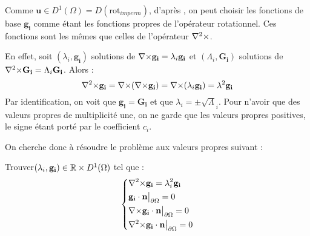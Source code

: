 Comme $\mathbf{u}\in D^1(\Omega)=D(\mathrm{rot}_{imperm})$, d'après \cite{Penel2004}, on peut choisir les fonctions de base
$\mathbf{g_i}$ comme étant les fonctions propres de l'opérateur rotationnel. Ces
fonctions sont les mêmes que celles de l'opérateur ${\nabla^2\times}$.

En effet, soit $(\lambda_i,\mathbf{g_i})$ solutions de ${\nabla\times} \mathbf{g_i} = \lambda_i\mathbf{g_i}$ et $(\Lambda_i,\mathbf{G_i})$ solutions de ${\nabla^2\times} \mathbf{G_i} = \Lambda_i\mathbf{G_i}$. Alors :
\[ {\nabla^2\times} \mathbf{g_i} = {\nabla\times}({\nabla\times} \mathbf{g_i})={\nabla\times}(\lambda_i\mathbf{g_i})=\lambda^2\mathbf{g_i} \]
Par identification, on voit que $\mathbf{g_i}=\mathbf{G_i}$ et que $\lambda_i=\pm\sqrt\Lambda_i$. Pour n'avoir que des valeurs propres de multiplicité une, on ne garde que les valeurs propres positives, le signe étant porté par le coefficient $c_i$.

On cherche donc à résoudre le problème aux valeurs propres suivant :
\begin{pb}\label{curlcurl}
Trouver$(\lambda_i,\mathbf{g_i})\in{\mathbb{R}}\times D^1(\Omega)$ tel que :
\begin{equation*}
\left\{\begin{aligned}
&{\nabla^2\times}  \mathbf{g_i} = \lambda_i^2 \mathbf{g_i}\\
&\mathbf{g_i}\cdot \mathbf{n}{\big\rvert_{\partial\Omega}} = 0\\
&{\nabla\times} \mathbf{g_i}\cdot \mathbf{n}{\big\rvert_{\partial\Omega}} = 0\\
&{\nabla^2\times}  \mathbf{g_i}\cdot \mathbf{n}{\big\rvert_{\partial\Omega}} = 0
\end{aligned}\right.
\end{equation*}\end{pb}

